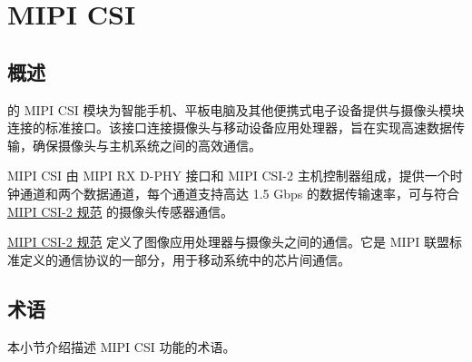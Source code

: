 \documentclass[main\_\_CN.tex]{subfiles}
\begin{document}

\ifglobal
\else
    {\let\clearpage\relax \listoftodos}
    {\let\clearpage\relax \listofdonetodos}
    \tableofcontents
\fi



\hypertarget{mipicsi}{}
\chapter{MIPI CSI}
\label{mod:mipicsi}



\section{概述}

\chipname{} 的 MIPI CSI 模块为智能手机、平板电脑及其他便携式电子设备提供与摄像头模块连接的标准接口。该接口连接摄像头与移动设备应用处理器，旨在实现高速数据传输，确保摄像头与主机系统之间的高效通信。

\chipname{} MIPI CSI 由 MIPI RX D-PHY 接口和 MIPI CSI-2 主机控制器组成，提供一个时钟通道和两个数据通道，每个通道支持高达 1.5 Gbps 的数据传输速率，可与符合 \hyperlink{https://www.mipi.org/specifications/csi-2}{MIPI CSI-2 规范} 的摄像头传感器通信。

\begin{tiplisting}
\hyperlink{https://www.mipi.org/specifications/csi-2}{MIPI CSI-2 规范} 定义了图像应用处理器与摄像头之间的通信。它是 MIPI 联盟标准定义的通信协议的一部分，用于移动系统中的芯片间通信。
\end{tiplisting}



\section{术语}

本小节介绍描述 MIPI CSI 功能的术语。
\end{document}

